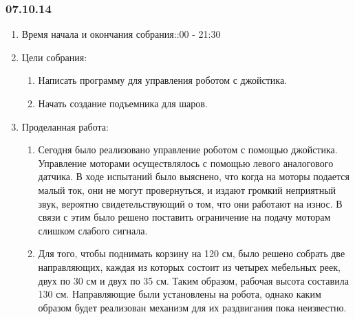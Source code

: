 
\subsubsection{07.10.14}

\begin{enumerate}
	\item Время начала и окончания собрания::00 - 21:30
	\item Цели собрания:\newline
	\begin{enumerate}
	  \item Написать программу для управления роботом с джойстика.\newline
	  
	  \item Начать создание подъемника для шаров.\newline
	  
    \end{enumerate}
	\item Проделанная работа:\newline
	\begin{enumerate}
	  \item Сегодня было реализовано управление роботом с помощью джойстика. Управление моторами осуществлялось с помощью левого аналогового датчика. В ходе испытаний было выяснено, что когда на моторы подается малый ток, они не могут провернуться, и издают громкий неприятный звук, вероятно свидетельствующий о том, что они работают на износ. В связи с этим было решено поставить ограничение на подачу моторам слишком слабого сигнала.\newline
      
      \item  Для того, чтобы поднимать корзину на 120 см, было решено собрать две направляющих, каждая из которых состоит из четырех мебельных реек, двух по 30 см и двух по 35 см. Таким образом, рабочая высота составила 130 см. Направляющие были установлены на робота, однако каким образом будет реализован механизм для их раздвигания пока неизвестно.\newline
      

\end{enumerate}
\end{enumerate}
